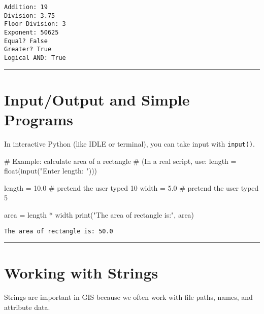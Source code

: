 \documentclass[
  11pt,
  letterpaper,
]{book}
\newenvironment{Shaded}{\begin{snugshade}}{\end{snugshade}}
\newcommand{\BuiltInTok}[1]{\textcolor[rgb]{0.00,0.23,0.31}{#1}}
\newcommand{\CommentTok}[1]{\textcolor[rgb]{0.37,0.37,0.37}{#1}}
\newcommand{\FloatTok}[1]{\textcolor[rgb]{0.68,0.00,0.00}{#1}}
\newcommand{\NormalTok}[1]{\textcolor[rgb]{0.00,0.23,0.31}{#1}}
\newcommand{\OperatorTok}[1]{\textcolor[rgb]{0.37,0.37,0.37}{#1}}
\newcommand{\StringTok}[1]{\textcolor[rgb]{0.13,0.47,0.30}{#1}}
\begin{document}
\begin{verbatim}
Addition: 19
Division: 3.75
Floor Division: 3
Exponent: 50625
Equal? False
Greater? True
Logical AND: True
\end{verbatim}

\begin{center}\rule{0.5\linewidth}{0.5pt}\end{center}

\section{Input/Output and Simple
Programs}\label{inputoutput-and-simple-programs}

In interactive Python (like IDLE or terminal), you can take input with
\texttt{input()}.

\begin{Shaded}
\begin{Highlighting}[]
\CommentTok{\# Example: calculate area of a rectangle}
\CommentTok{\# (In a real script, use: length = float(input("Enter length: ")))}

\NormalTok{length }\OperatorTok{=} \FloatTok{10.0}   \CommentTok{\# pretend the user typed 10}
\NormalTok{width }\OperatorTok{=} \FloatTok{5.0}     \CommentTok{\# pretend the user typed 5}

\NormalTok{area }\OperatorTok{=}\NormalTok{ length }\OperatorTok{*}\NormalTok{ width}
\BuiltInTok{print}\NormalTok{(}\StringTok{"The area of rectangle is:"}\NormalTok{, area)}
\end{Highlighting}
\end{Shaded}

\begin{verbatim}
The area of rectangle is: 50.0
\end{verbatim}

\begin{center}\rule{0.5\linewidth}{0.5pt}\end{center}

\section{Working with Strings}\label{working-with-strings}

Strings are important in GIS because we often work with file paths,
names, and attribute data.
\end{document}
